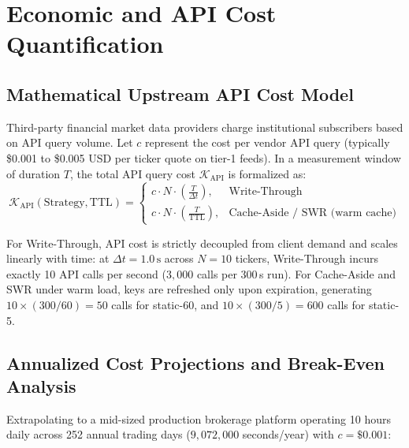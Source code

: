 \documentclass[11pt,a4paper]{article}
\begin{document}
\section{Economic and API Cost Quantification}
\label{sec:cost}

\subsection{Mathematical Upstream API Cost Model}

Third-party financial market data providers charge institutional subscribers based on API query volume. Let $c$ represent the cost per vendor API query (typically \$0.001 to \$0.005 USD per ticker quote on tier-1 feeds). In a measurement window of duration $T$, the total API query cost $\mathcal{K}_{\text{API}}$ is formalized as:
\begin{equation}
  \mathcal{K}_{\text{API}}(\text{Strategy}, \text{TTL}) =
  \begin{cases}
    c \cdot N \cdot \left(\frac{T}{\Delta t}\right), & \text{Write-Through} \\[0.8em]
    c \cdot N \cdot \left(\frac{T}{\text{TTL}}\right), & \text{Cache-Aside / SWR (warm cache)}
  \end{cases}
  \label{eq:cost_model}
\end{equation}

For Write-Through, API cost is strictly decoupled from client demand and scales linearly with time: at $\Delta t = 1.0\,\text{s}$ across $N=10$ tickers, Write-Through incurs exactly 10 API calls per second ($3{,}000$ calls per 300\,s run). For Cache-Aside and SWR under warm load, keys are refreshed only upon expiration, generating $10 \times (300 / 60) = 50$ calls for static-60, and $10 \times (300 / 5) = 600$ calls for static-5.

\subsection{Annualized Cost Projections and Break-Even Analysis}

Extrapolating to a mid-sized production brokerage platform operating 10 hours daily across 252 annual trading days ($9{,}072{,}000$ seconds/year) with $c = \$0.001$:
\end{document}
